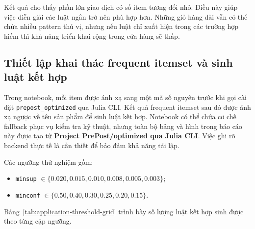 Kết quả cho thấy phần lớn giao dịch có số item tương đối nhỏ. Điều này giúp việc diễn giải các luật ngắn trở nên phù hợp hơn. Những giỏ hàng dài vẫn có thể chứa nhiều pattern thú vị, nhưng nếu luật chỉ xuất hiện trong các trường hợp hiếm thì khả năng triển khai rộng trong cửa hàng sẽ thấp.

\subsection{Thiết lập khai thác frequent itemset và sinh luật kết hợp}
\label{subsec:application-mining-setup}

Trong notebook, mỗi item được ánh xạ sang một mã số nguyên trước khi gọi
cài đặt \texttt{prepost\_optimized} qua Julia CLI. Kết quả frequent itemset sau
đó được ánh xạ ngược về tên sản phẩm để sinh luật kết hợp. Notebook có thể chứa
cơ chế fallback phục vụ kiểm tra kỹ thuật, nhưng toàn bộ bảng và hình trong báo
cáo này được tạo từ \textbf{Project PrePost/optimized qua Julia CLI}. Việc ghi
rõ backend thực tế là cần thiết để bảo đảm khả năng tái lập.

Các ngưỡng thử nghiệm gồm:

\begin{itemize}
    \item \texttt{minsup} $\in \{0.020, 0.015, 0.010, 0.008, 0.005, 0.003\}$;
    \item \texttt{minconf} $\in \{0.50, 0.40, 0.30, 0.25, 0.20, 0.15\}$.
\end{itemize}

Bảng~\ref{tab:application-threshold-grid} trình bày số lượng luật kết hợp sinh được theo từng cặp ngưỡng.

\begin{table}[H]
\centering
\caption{Số lượng association rules theo từng cặp \texttt{minsup} và \texttt{minconf}}
\label{tab:application-threshold-grid}
\end{table}

